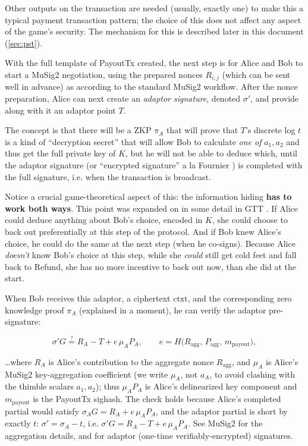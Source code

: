 \documentclass[11pt]{article}
\begin{document}
Other outputs on the transaction are needed (usually, exactly one) to make this a typical payment transaction pattern; the choice of this does not affect any aspect of the game's security. The mechanism for this is described later in this document (\ref{sec:pst}).

With the full template of PayoutTx created, the next step is for Alice and Bob to start a MuSig2 negotiation, using the prepared nonces $R_{i,j}$ (which can be sent well in advance) as according to the standard MuSig2 workflow. After the nonce preparation, Alice can next create an \emph{adaptor signature}, denoted $\sigma'$, and provide along with it an adaptor point $T$.

The concept is that there will be a ZKP $\pi_A$ that will prove that $T$'s discrete log $t$ is a kind of ``decryption secret'' that will allow Bob to calculate \emph{one of} $a_1, a_2$ and thus get the full private key of $K$, but he will not be able to deduce which, until the adaptor signature (or ``encrypted signature'' a la Fournier \cite{fournier}) is completed with the full signature, i.e. when the transaction is broadcast.

Notice a crucial game-theoretical aspect of this: the information hiding \textbf{has to work both ways}. This point was expanded on in some detail in GTT \cite{gerhardt2026}. If Alice could deduce anything about Bob's choice, encoded in $K$, she could choose to back out preferentially at this step of the protocol. And if Bob knew Alice's choice, he could do the same at the next step (when he co-signs). Because Alice \emph{doesn't} know Bob's choice at this step, while she \emph{could} still get cold feet and fall back to Refund, she has no more incentive to back out now, than she did at the start.

When Bob receives this adaptor, a ciphertext $\textrm{ctxt}$, and the corresponding zero knowledge proof $\pi_A$ (explained in a moment), he can verify the adaptor pre-signature:

\[\sigma' G \stackrel{?}{=} R_{A} - T + e\,\mu_A P_A,\qquad e = H\big(R_{\mathrm{agg}},\,P_{\mathrm{agg}},\,m_{\mathrm{payout}}\big),\]

\ldots where $R_{A}$ is Alice's contribution to the aggregate nonce $R_{\mathrm{agg}}$, and $\mu_A$ is Alice's MuSig2 key-aggregation coefficient (we write $\mu_A$, not $a_A$, to avoid clashing with the thimble scalars $a_1,a_2$); thus $\mu_A P_A$ is Alice's delinearized key component and $m_{\mathrm{payout}}$ is the PayoutTx sighash. The check holds because Alice's completed partial would satisfy $\sigma_A G = R_A + e\,\mu_A P_A$, and the adaptor partial is short by exactly $t$: $\sigma' = \sigma_A - t$, i.e. $\sigma'G = R_A - T + e\,\mu_A P_A$. See MuSig2 \cite{musig2,bip327} for the aggregation details, and \cite{fournier} for adaptor (one-time verifiably-encrypted) signatures.
\end{document}
